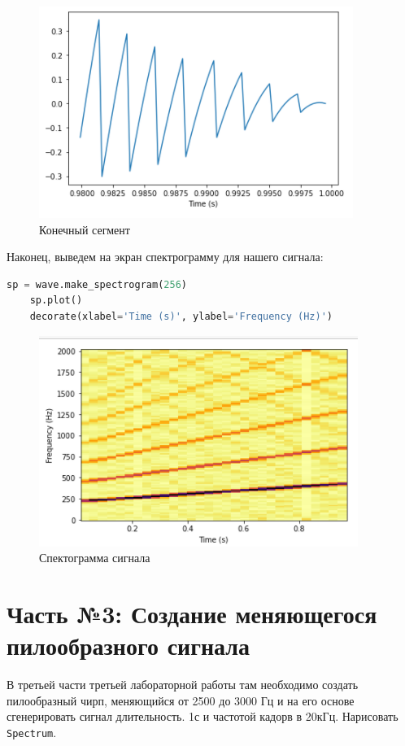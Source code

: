 \documentclass[a4paper]{article}
\begin{document}
            \begin{figure}[H]
                \centering
                \includegraphics{ex_2_segment_end.png}
                \caption{Конечный сегмент}
                \label{fig:ex_2_segment_end}
            \end{figure}
            
            Наконец, выведем на экран спектрограмму для нашего сигнала:
            
\begin{lstlisting}[language=Python, caption= Спектограмма сигнала]
    sp = wave.make_spectrogram(256)
    sp.plot()
    decorate(xlabel='Time (s)', ylabel='Frequency (Hz)')
\end{lstlisting}               
            
            \begin{figure}[H]
                \centering
                \includegraphics{ex_2_spectogramma.png}
                \caption{Спектограмма сигнала}
                \label{fig:ex_2_spectogramma}
            \end{figure}
            
    \newpage
        \section{Часть №3: Создание меняющегося пилообразного сигнала}
            В третьей части третьей лабораторной работы там необходимо создать пилообразный чирп, меняющийся от 2500 до 3000 Гц и на его основе сгенерировать сигнал длительность. 1с и частотой кадорв в 20кГц. Нарисовать \texttt{Spectrum}.
            
\end{document}
